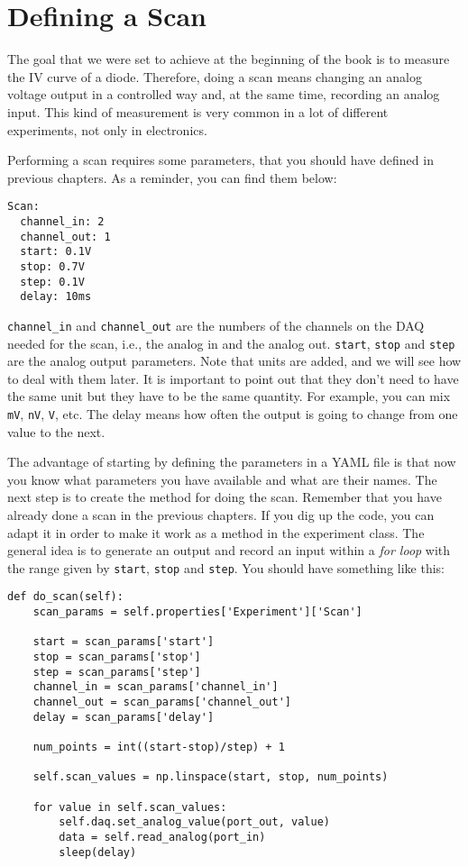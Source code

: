 \section{Defining a Scan}\label{defining-ascan}
The goal that we were set to achieve at the beginning of the book is to measure the {IV} curve of a diode. Therefore, doing a scan means changing an analog voltage output in a controlled way and, at the same time, recording an analog input. This kind of measurement is very common in a lot of different experiments, not only in electronics.


Performing a scan requires some parameters, that you should have defined in previous chapters. As a reminder, you can find them below:

\begin{verbatim}
Scan:
  channel_in: 2
  channel_out: 1
  start: 0.1V
  stop: 0.7V
  step: 0.1V
  delay: 10ms
\end{verbatim}

\texttt{channel_in} and \texttt{channel_out} are the numbers of the channels on the DAQ needed for the scan, i.e., the analog in and the analog out. \texttt{start}, \texttt{stop} and \texttt{step} are the analog output parameters. Note that units are added, and we will see how to deal with them later. It is important to point out that they don't need to have the same unit but they have to be the same quantity. For example, you can mix \texttt{mV},  \texttt{nV},  \texttt{V}, etc. The delay means how often the output is going to change from one value to the next.

The advantage of starting by defining the parameters in a {YAML} file is that now you know what parameters you have available and what are their names. The next step is to create the method for doing the scan. Remember that you have already done a scan in the previous chapters. If you dig up the code, you can adapt it in order to make it work as a method in the experiment class. The general idea is to
generate an output and record an input within a \emph{for loop} with the range given by \texttt{start}, \texttt{stop} and \texttt{step}. You should have something like this:

\begin{verbatim}
def do_scan(self):
    scan_params = self.properties['Experiment']['Scan']
    
    start = scan_params['start']
    stop = scan_params['stop']
    step = scan_params['step']
    channel_in = scan_params['channel_in']
    channel_out = scan_params['channel_out']
    delay = scan_params['delay']

    num_points = int((start-stop)/step) + 1

    self.scan_values = np.linspace(start, stop, num_points)

    for value in self.scan_values:
        self.daq.set_analog_value(port_out, value)
        data = self.read_analog(port_in)
        sleep(delay)
\end{verbatim}

